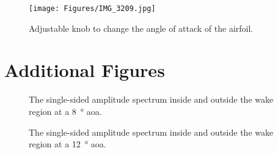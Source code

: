 \begin{figure}[htpb]
    \centering
    \texttt{[image: Figures/IMG\_3209.jpg]}
    \caption[Adjustable knob to change the angle of attack of the airfoil.]{Adjustable knob to change the angle of attack of the airfoil.}
    \label{fig: SpeedControl}
\end{figure}

\newpage

\section{Additional Figures} \label{sec:additional_figures}

%     


\begin{figure}[htpb]
     \centering
     
     \caption[A graph of the single-sided amplitude spectrum inside and outside the wake at a eight degree angle of attack.]{The single-sided amplitude spectrum inside and outside the wake region at a \qty{8}{\degree} \acrshort{aoa}.}
     \label{fig:SSAS_at_8AoA}
\end{figure}

\begin{figure}[htpb]
     \centering
     
     \caption[A graph of the single-sided amplitude spectrum inside and outside the wake at a twelve degree angle of attack.]{The single-sided amplitude spectrum inside and outside the wake region at a \qty{12}{\degree} \acrshort{aoa}.}
     \label{fig:SSAS_at_12AoA}
\end{figure}

